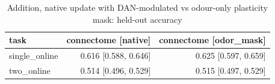 \begin{table}[t]
\centering
\small
\begin{tabular}{lrr}
\toprule
task & connectome [native] & connectome [odor\_mask] \\
\midrule
single\_online & 0.616 [0.588, 0.646] & 0.625 [0.597, 0.659] \\
two\_online & 0.514 [0.496, 0.529] & 0.515 [0.497, 0.529] \\
\bottomrule
\end{tabular}
\caption{Addition, native update with DAN-modulated vs odour-only plasticity mask: held-out accuracy}
\label{tab:dan_kc_ablation_acc}
\end{table}